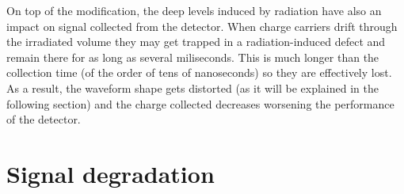 On top of the \neff modification, the deep levels induced by radiation have also an impact on signal collected from the detector. When charge carriers drift through the irradiated volume they may get trapped in a radiation-induced defect and remain there for as long as several miliseconds. This is much longer than the collection time (of the order of tens of nanoseconds) so they are effectively lost. As a result, the waveform shape gets distorted (as it will be explained in the following section) and the charge collected decreases worsening the performance of the detector.

\section{Signal degradation} %
\label{sec:signalDeg}



